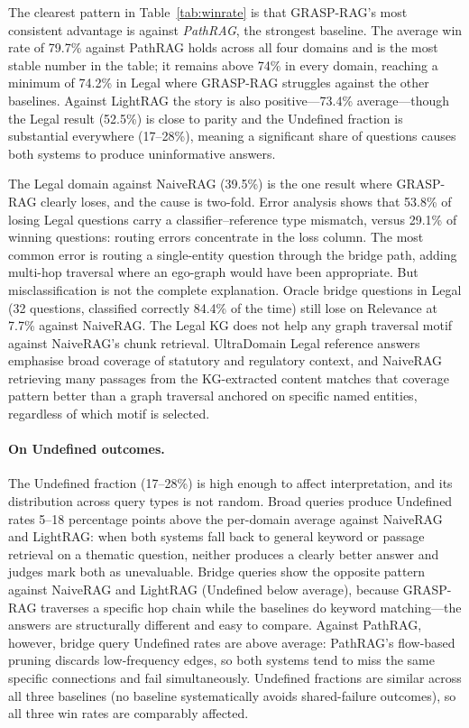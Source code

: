The clearest pattern in Table~\ref{tab:winrate} is that GRASP-RAG's most
consistent advantage is against \emph{PathRAG}, the strongest baseline.
The average win rate of 79.7\% against PathRAG holds across all four domains
and is the most stable number in the table; it remains above 74\% in every
domain, reaching a minimum of 74.2\% in Legal where GRASP-RAG struggles
against the other baselines.
Against LightRAG the story is also positive---73.4\% average---though the
Legal result (52.5\%) is close to parity and the Undefined fraction is
substantial everywhere (17--28\%), meaning a significant share of questions
causes both systems to produce uninformative answers.

The Legal domain against NaiveRAG (39.5\%) is the one result where GRASP-RAG
clearly loses, and the cause is two-fold.
Error analysis shows that 53.8\% of losing Legal questions carry a
classifier--reference type mismatch, versus 29.1\% of winning questions: routing
errors concentrate in the loss column.
The most common error is routing a single-entity question through the bridge
path, adding multi-hop traversal where an ego-graph would have been
appropriate.
But misclassification is not the complete explanation.
Oracle bridge questions in Legal (32 questions, classified correctly 84.4\%
of the time) still lose on Relevance at 7.7\% against NaiveRAG.
The Legal KG does not help any graph traversal motif against NaiveRAG's chunk
retrieval.
UltraDomain Legal reference answers emphasise broad coverage of statutory and
regulatory context, and NaiveRAG retrieving many passages from the
KG-extracted content matches that coverage pattern better than a graph
traversal anchored on specific named entities, regardless of which motif is
selected.

\paragraph{On Undefined outcomes.}
The Undefined fraction (17--28\%) is high enough to affect interpretation,
and its distribution across query types is not random.
Broad queries produce Undefined rates 5--18 percentage points above the
per-domain average against NaiveRAG and LightRAG: when both systems fall back
to general keyword or passage retrieval on a thematic question, neither
produces a clearly better answer and judges mark both as unevaluable.
Bridge queries show the opposite pattern against NaiveRAG and LightRAG
(Undefined below average), because GRASP-RAG traverses a specific hop chain
while the baselines do keyword matching---the answers are structurally
different and easy to compare.
Against PathRAG, however, bridge query Undefined rates are above average:
PathRAG's flow-based pruning discards low-frequency edges, so both systems
tend to miss the same specific connections and fail simultaneously.
Undefined fractions are similar across all three baselines (no baseline
systematically avoids shared-failure outcomes), so all three win rates are
comparably affected.

